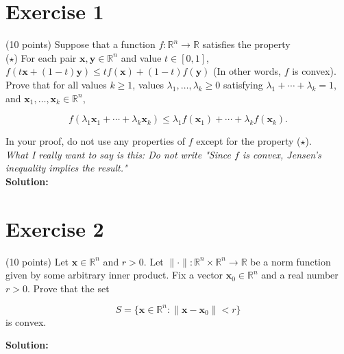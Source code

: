 \documentclass{article}
\begin{document}
\section*{Exercise 1}
(10 points) Suppose that a function $f: \mathbb{R}^n \to \mathbb{R}$ satisfies the property \\

($\star$) For each pair $\mathbf{x}, \mathbf{y} \in \mathbb{R}^n$ and value $t \in [0,1]$, $f(t\mathbf{x} + (1-t)\mathbf{y}) \leq tf(\mathbf{x}) + (1-t)f(\mathbf{y})$ (In other words, $f$ is convex). \\

Prove that for all values $k \geq 1$, values $\lambda_1,\ldots,\lambda_k \geq 0$ satisfying $\lambda_1 + \cdots + \lambda_k = 1$, and $\mathbf{x}_1,\ldots,\mathbf{x}_k \in \mathbb{R}^n$,

$$f(\lambda_1\mathbf{x}_1 + \cdots + \lambda_k\mathbf{x}_k) \leq \lambda_1f(\mathbf{x}_1) + \cdots + \lambda_kf(\mathbf{x}_k).$$

In your proof, do not use any properties of $f$ except for the property ($\star$). \\

\textit{What I really want to say is this: Do not write "Since $f$ is convex, Jensen's inequality implies the result."} \\

\textbf{Solution: } \\



\newpage

\section*{Exercise 2}
(10 points) Let $\mathbf{x} \in \mathbb{R}^n$ and $r > 0$. Let $\|\cdot\|: \mathbb{R}^n \times \mathbb{R}^n \to \mathbb{R}$ be a norm function given by some arbitrary inner product. Fix a vector $\mathbf{x}_0 \in \mathbb{R}^n$ and a real number $r > 0$. Prove that the set

$$S = \{\mathbf{x} \in \mathbb{R}^n : \|\mathbf{x} - \mathbf{x}_0\| < r\}$$
is convex.

\textbf{Solution: } \\



\newpage
\end{document}
